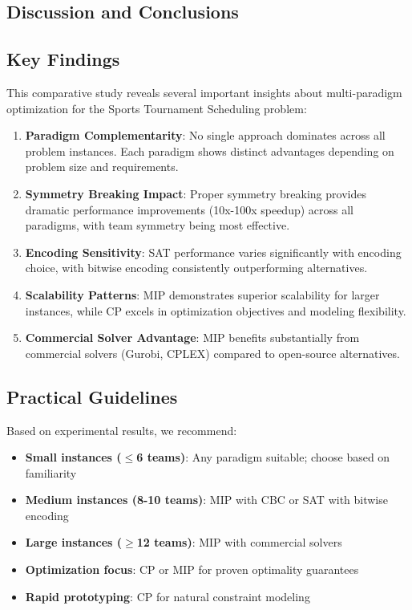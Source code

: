 \documentclass[11pt]{article}
\begin{document}
\begin{itemize}
\section{Discussion and Conclusions}

\subsection{Key Findings}

This comparative study reveals several important insights about multi-paradigm optimization for the Sports Tournament Scheduling problem:

\begin{enumerate}
    \item \textbf{Paradigm Complementarity}: No single approach dominates across all problem instances. Each paradigm shows distinct advantages depending on problem size and requirements.
    
    \item \textbf{Symmetry Breaking Impact}: Proper symmetry breaking provides dramatic performance improvements (10x-100x speedup) across all paradigms, with team symmetry being most effective.
    
    \item \textbf{Encoding Sensitivity}: SAT performance varies significantly with encoding choice, with bitwise encoding consistently outperforming alternatives.
    
    \item \textbf{Scalability Patterns}: MIP demonstrates superior scalability for larger instances, while CP excels in optimization objectives and modeling flexibility.
    
    \item \textbf{Commercial Solver Advantage}: MIP benefits substantially from commercial solvers (Gurobi, CPLEX) compared to open-source alternatives.
\end{enumerate}

\subsection{Practical Guidelines}

Based on experimental results, we recommend:

\begin{itemize}
    \item \textbf{Small instances ($\leq$6 teams)}: Any paradigm suitable; choose based on familiarity
    \item \textbf{Medium instances (8-10 teams)}: MIP with CBC or SAT with bitwise encoding
    \item \textbf{Large instances ($\geq$12 teams)}: MIP with commercial solvers
    \item \textbf{Optimization focus}: CP or MIP for proven optimality guarantees
    \item \textbf{Rapid prototyping}: CP for natural constraint modeling
\end{itemize}


\end{itemize}
\end{document}
